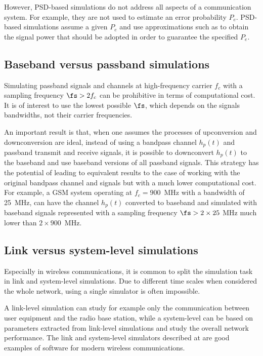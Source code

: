 However, PSD-based simulations do not address all aspects of a communication system. For example, they are not used to estimate an error probability $P_e$. PSD-based simulations assume a given $P_e$ and use approximations such as  to obtain the signal power that should be adopted in order to guarantee the specified $P_e$.
		
\subsection{Baseband versus passband simulations}

Simulating passband signals and channels at high-frequency carrier $f_c$ with a sampling frequency $\fs > 2 f_c$ can be prohibitive in terms of computational cost. It is of interest to use the lowest possible $\fs$, which depends on the signals bandwidths, not their carrier frequencies.


An important result is that, when one assumes the processes of upconversion and downconversion are ideal, instead of using 
a bandpass channel $h_p(t)$ and passband transmit and receive signals, 
it is possible to downconvert $h_p(t)$ to the baseband and use 
baseband versions of all passband signals. This strategy has the potential of leading to equivalent results to
the case of working with the original bandpass channel and signals but with a much lower computational cost. For example, a GSM system operating at $f_c=900$~MHz with a bandwidth of 25~MHz, can have the channel $h_p(t)$ converted to baseband and simulated with baseband signals represented with a sampling frequency $\fs > 2 \times 25~$MHz much lower than $2 \times 900$~MHz.

\subsection{Link versus system-level simulations}

Especially in wireless communications, it is common to split the simulation task in link and system-level simulations. Due to different time scales when considered the whole network, using a single simulator is often impossible.

A link-level simulation can study for example only the  communication between user equipment and the radio base station, while a system-level can be based on parameters extracted from link-level simulations and study the overall network performance. The link and system-level simulators described at  are good examples of software for modern wireless communications. %


